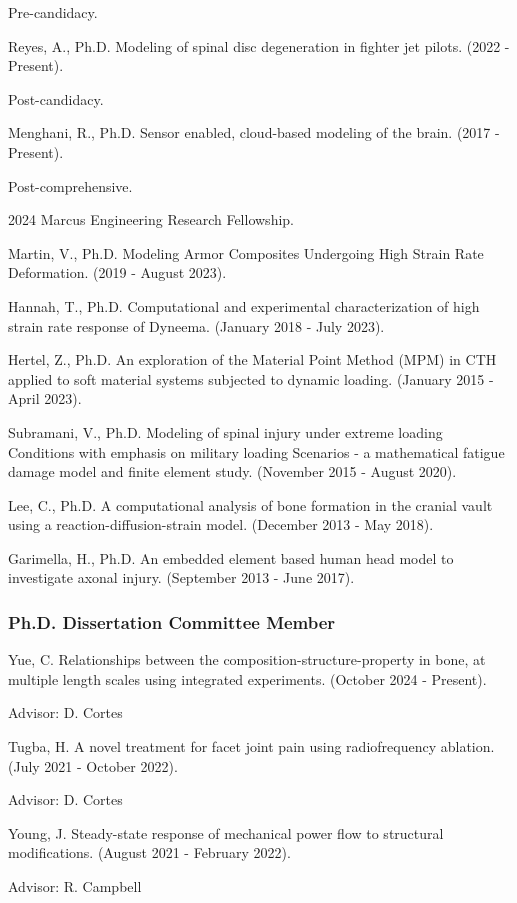 \documentclass[a4paper,10pt]{article}
\begin{document}
Pre-candidacy.

Reyes, A., Ph.D. Modeling of spinal disc degeneration in fighter jet pilots. (2022 - Present).

Post-candidacy.

Menghani, R., Ph.D. Sensor enabled, cloud-based modeling of the brain. (2017 - Present).

Post-comprehensive.

2024 Marcus Engineering Research Fellowship.

Martin, V., Ph.D. Modeling Armor Composites Undergoing High Strain Rate Deformation. (2019 - August 2023).

Hannah, T., Ph.D. Computational and experimental characterization of high strain rate response of Dyneema. (January 2018 - July 2023).

Hertel, Z., Ph.D. An exploration of the Material Point Method (MPM) in CTH applied to soft material systems subjected to dynamic loading. (January 2015 - April 2023).

Subramani, V., Ph.D. Modeling of spinal injury under extreme loading Conditions with emphasis on military loading Scenarios - a mathematical fatigue damage model and finite element study. (November 2015 - August 2020).

Lee, C., Ph.D. A computational analysis of bone formation in the cranial vault using a reaction-diffusion-strain model. (December 2013 - May 2018).

Garimella, H., Ph.D. An embedded element based human head model to investigate axonal injury. (September 2013 - June 2017).



\subsubsection*{Ph.D. Dissertation Committee Member}
Yue, C. Relationships between the composition-structure-property in bone, at multiple length scales using integrated experiments. (October 2024 - Present).

Advisor: D. Cortes

Tugba, H. A novel treatment for facet joint pain using radiofrequency ablation. (July 2021 - October 2022).

Advisor: D. Cortes

Young, J. Steady-state response of mechanical power flow to structural modifications. (August 2021 - February 2022).

Advisor: R. Campbell
\end{document}
